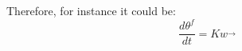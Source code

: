 Therefore, for instance it could be:
\begin{equation}
\frac{d \theta^f}{dt} = Kw \vec{}{}
\end{equation}
